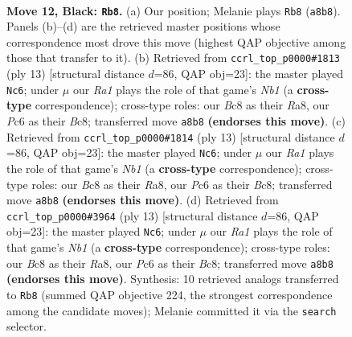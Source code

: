 \documentclass[11pt]{article}
\begin{document}
\clearpage

\begin{figure}[p]\centering
\begin{subfigure}{0.46\textwidth}\centering
\resizebox{\linewidth}{!}{%
\newchessgame
\chessboard[
  setfen={r1bq1rk1/pp5p/n1pb2p1/3p1p1n/3P1P2/5NP1/PP1NP1BP/R1BQR1K1 b - - 2 12},
  showmover=false,
  pgfstyle=straightmove, color=movearrow, markmove={a8-b8}
]}
\caption{}
\end{subfigure}\hfill
\begin{subfigure}{0.46\textwidth}\centering
\resizebox{\linewidth}{!}{%
\newchessgame
\chessboard[
  setfen={rnbq1rk1/pp2ppbp/3p1np1/2p5/2PPP3/2N1BP2/PP2N1PP/R2QKB1R b KQ - 1 7},
  showmover=false,
  pgfstyle=straightmove, color=movearrow, markmove={b8-c6}
]}
\caption{}
\end{subfigure}
\\[4pt]
\begin{subfigure}{0.46\textwidth}\centering
\resizebox{\linewidth}{!}{%
\newchessgame
\chessboard[
  setfen={rnbq1rk1/pp2ppbp/3p1np1/2p5/2PPP3/2N1BP2/PP2N1PP/R2QKB1R b KQ - 1 7},
  showmover=false,
  pgfstyle=straightmove, color=movearrow, markmove={b8-c6}
]}
\caption{}
\end{subfigure}\hfill
\begin{subfigure}{0.46\textwidth}\centering
\resizebox{\linewidth}{!}{%
\newchessgame
\chessboard[
  setfen={rnbq1rk1/pp2ppbp/3p1np1/2p5/2PPP3/2N1BP2/PP2N1PP/R2QKB1R b KQ - 1 7},
  showmover=false,
  pgfstyle=straightmove, color=movearrow, markmove={b8-c6}
]}
\caption{}
\end{subfigure}
\caption{\textbf{Move 12, Black: \texttt{Rb8}.} (a) Our position; Melanie plays \texttt{Rb8} (\texttt{a8b8}). Panels (b)--(d) are the retrieved master positions whose correspondence most drove this move (highest QAP objective among those that transfer to it). (b) Retrieved from \texttt{ccrl\_top\_p0000\#1813} (ply 13) [structural distance $d$=86, QAP obj=23]: the master played \texttt{Nc6}; under $\mu$ our \emph{Ra1} plays the role of that game's \emph{Nb1} (a \textbf{cross-type} correspondence); cross-type roles: our \emph{B}c8 as their \emph{R}a8, our \emph{P}c6 as their \emph{B}c8; transferred move \texttt{a8b8} \textbf{(endorses this move)}. (c) Retrieved from \texttt{ccrl\_top\_p0000\#1814} (ply 13) [structural distance $d$=86, QAP obj=23]: the master played \texttt{Nc6}; under $\mu$ our \emph{Ra1} plays the role of that game's \emph{Nb1} (a \textbf{cross-type} correspondence); cross-type roles: our \emph{B}c8 as their \emph{R}a8, our \emph{P}c6 as their \emph{B}c8; transferred move \texttt{a8b8} \textbf{(endorses this move)}. (d) Retrieved from \texttt{ccrl\_top\_p0000\#3964} (ply 13) [structural distance $d$=86, QAP obj=23]: the master played \texttt{Nc6}; under $\mu$ our \emph{Ra1} plays the role of that game's \emph{Nb1} (a \textbf{cross-type} correspondence); cross-type roles: our \emph{B}c8 as their \emph{R}a8, our \emph{P}c6 as their \emph{B}c8; transferred move \texttt{a8b8} \textbf{(endorses this move)}. Synthesis: 10 retrieved analogs transferred to \texttt{Rb8} (summed QAP objective 224, the strongest correspondence among the candidate moves); Melanie committed it via the \texttt{search} selector.}

\end{figure}
\end{document}

